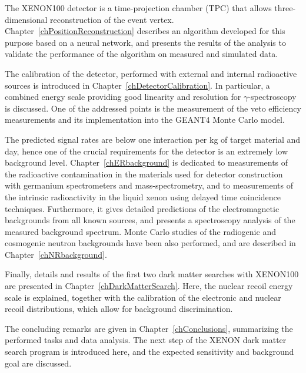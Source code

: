 The XENON100 detector is a time-projection chamber (TPC) that allows three-dimensional reconstruction of the event vertex. Chapter~\ref{chPositionReconstruction} describes an algorithm developed for this purpose based on a neural network, and presents the results of the analysis to validate the performance of the algorithm on measured and simulated data.

The calibration of the detector, performed with external and internal radioactive sources is introduced in Chapter~\ref{chDetectorCalibration}. In particular, a combined energy scale providing good linearity and resolution for $\gamma$-spectroscopy is discussed. One of the addressed points is the measurement of the veto efficiency measurements and its implementation into the GEANT4 Monte Carlo model.

The predicted signal rates are below one interaction per kg of target material and day, hence one of the crucial requirements for the detector is an extremely low background level. Chapter~\ref{chERbackground} is dedicated to measurements of the radioactive contamination in the materials used for detector construction with germanium spectrometers and mass-spectrometry, and to measurements of the intrinsic radioactivity in the liquid xenon using delayed time coincidence techniques. Furthermore, it gives detailed predictions of the electromagnetic backgrounds from all known sources, and presents a spectroscopy analysis of the measured background spectrum. 
Monte Carlo studies of the radiogenic and cosmogenic neutron backgrounds have been also performed, and are described in Chapter~\ref{chNRbackground}.

Finally, details and results of the first two dark matter searches with XENON100 are presented in Chapter~\ref{chDarkMatterSearch}. Here, the nuclear recoil energy scale is explained, together with the calibration of the electronic and nuclear recoil distributions, which allow for background discrimination.

The concluding remarks are given in Chapter~\ref{chConclusions}, summarizing the performed tasks and data analysis. The next step of the XENON dark matter search program is introduced here, and the expected sensitivity and background goal are discussed.

